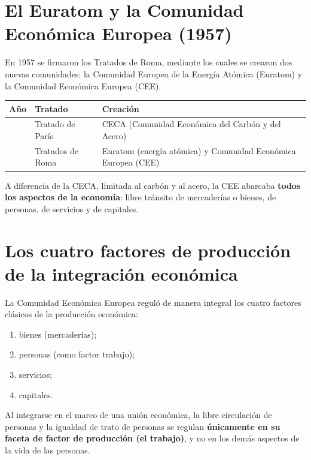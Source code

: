 \documentclass[12pt,oneside]{book}
\begin{document}
\section{El Euratom y la Comunidad Económica Europea (1957)}

En 1957 se firmaron los Tratados de Roma, mediante los cuales se crearon dos nuevas comunidades: la Comunidad Europea de la Energía Atómica (Euratom) y la Comunidad Económica Europea (CEE).

\begin{table}[H]
\centering
\small
\renewcommand{\arraystretch}{1.3}
\begin{tabularx}{\textwidth}{
    >{\raggedright\arraybackslash}p{}
    >{\raggedright\arraybackslash}p{}
    >{\raggedright\arraybackslash}X
}
\toprule
\textbf{Año} & \textbf{Tratado} & \textbf{Creación} \\
\midrule
1951 & Tratado de París & CECA (Comunidad Económica del Carbón y del Acero) \\
1957 & Tratados de Roma & Euratom (energía atómica) y Comunidad Económica Europea (CEE) \\
\bottomrule
\end{tabularx}
\end{table}

A diferencia de la CECA, limitada al carbón y al acero, la CEE abarcaba \textbf{todos los aspectos de la economía}: libre tránsito de mercaderías o bienes, de personas, de servicios y de capitales.

\section{Los cuatro factores de producción de la integración económica}

La Comunidad Económica Europea reguló de manera integral los cuatro factores clásicos de la producción económica:

\begin{enumerate}
    \item bienes (mercaderías);
    \item personas (como factor trabajo);
    \item servicios;
    \item capitales.
\end{enumerate}

\begin{important}
Al integrarse en el marco de una unión económica, la libre circulación de personas y la igualdad de trato de personas se regulan \textbf{únicamente en su faceta de factor de producción (el trabajo)}, y no en los demás aspectos de la vida de las personas.
\end{important}
\end{document}
